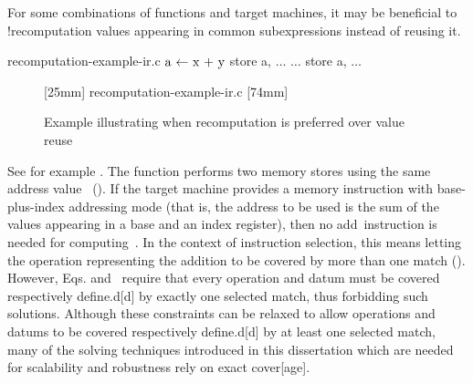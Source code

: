 For some combinations of \glspl{function} and \glspl{target machine}, it may be
beneficial to \glsshort!{recomputation} values appearing in common
subexpressions instead of reusing it.
%
\begin{filecontents*}{recomputation-example-ir.c}
$\irAssign{a}{x + y}$
store a, $\ldots$
$\ldots$
store a, $\ldots$
\end{filecontents*}
%
\begin{figure}
  \centering%
  \mbox{}%
  \hfill%
                [25mm]%
                {%
                                  {recomputation-example-ir.c}%
                }%
  \hfill%
                [74mm]%
                {%
                }%
  \hfill%
  \mbox{}

  \caption{%
    Example illustrating when recomputation is preferred over value reuse%
  }%
\end{figure}
%
See for example .
%
The \gls{function} performs two memory stores using the same address
value~ ().
%
If the \gls{target machine} provides a memory \gls{instruction} with
base-plus-index addressing mode (that is, the address to be used is the sum of
the values appearing in a base and an index \gls{register}), then no
add~\gls{instruction} is needed for computing~.
%
In the context of \gls{instruction selection}, this means letting the
\gls{operation} representing the addition to be covered by more than one
\gls{match} ().
%
However, Eqs.\thinspace{}
and~ require that every \gls{operation} and
\gls{datum} must be covered respectively \gls{define.d}[d] by exactly one
selected \gls{match}, thus forbidding such \glspl{solution}.
%
Although these \glspl{constraint} can be relaxed to allow \glspl{operation} and
\glspl{datum} to be covered respectively \gls{define.d}[d] by at least one
selected \gls{match}, many of the solving techniques introduced in this
dissertation which are needed for scalability and robustness rely on exact
\gls{cover}[age].


